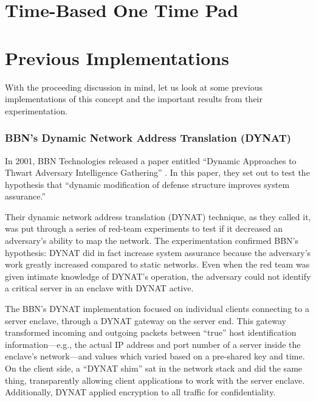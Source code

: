 \section{Time-Based One Time Pad}
\label{sec:totp}

\section{Previous Implementations}
\label{sec:related_research}
\par With the proceeding discussion in mind, let us look at some previous implementations of this concept and the important results from their experimentation.

\subsubsection{BBN's Dynamic Network Address Translation (DYNAT)}
\par In 2001, BBN Technologies released a paper entitled ``Dynamic Approaches to Thwart Adversary Intelligence Gathering'' \cite{BBNDYNAT}. In this paper, they set out to test the hypothesis that ``dynamic modification of defense structure improves system assurance.''

\par Their dynamic network address translation (DYNAT) technique, as they called it, was put through a series of red-team experiments to test if it decreased an adversary's ability to map the network. The experimentation confirmed BBN's hypothesis: DYNAT did in fact increase system assurance because the adversary's work greatly increased compared to static networks. Even when the red team was given intimate knowledge of DYNAT's operation, the adversary could not identify a critical server in an enclave with DYNAT active.

\par The BBN's DYNAT implementation focused on individual clients connecting to a server enclave, through a DYNAT gateway on the server end. This gateway transformed incoming and outgoing packets between ``true'' host identification information---e.g., the actual IP address and port number of a server inside the enclave's network---and values which varied based on a pre-shared key and time. On the client side, a ``DYNAT shim'' sat in the network stack and did the same thing, transparently allowing client applications to work with the server enclave. Additionally, DYNAT applied encryption to all traffic for confidentiality.

